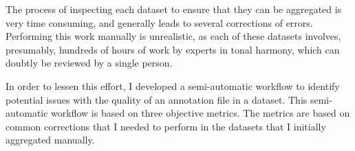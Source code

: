 
The process of inspecting each dataset to ensure that they
can be aggregated is very time consuming, and generally
leads to several corrections of errors. Performing this work
manually is unrealistic, as each of these datasets involves,
presumably, hundreds of hours of work by experts in tonal
harmony, which can doubtly be reviewed by a single person.

In order to lessen this effort, I developed a semi-automatic
workflow to identify potential issues with the quality of an
annotation file in a dataset. This semi-automatic workflow
is based on three objective metrics. The metrics are based
on common corrections that I needed to perform in the
datasets that I initially aggregated manually.

